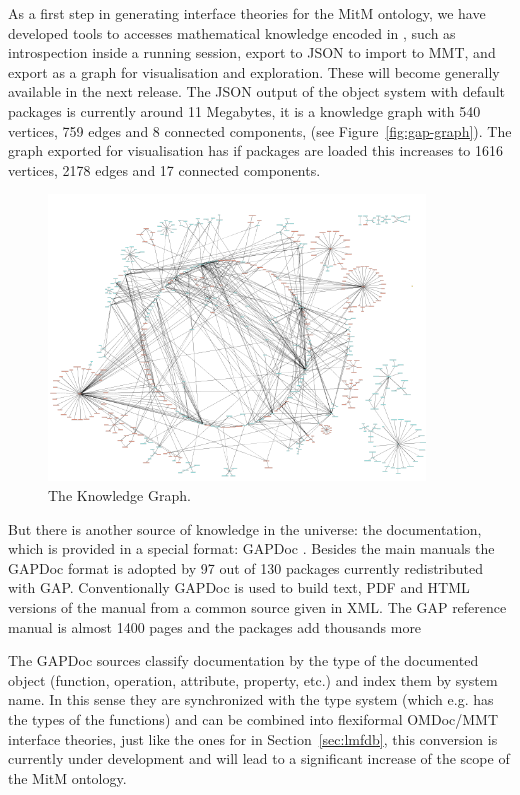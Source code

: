 As a first step in generating interface theories for the MitM ontology, we have developed
tools to accesses mathematical knowledge encoded in \GAP, such as introspection inside a
running \GAP session, export to JSON to import to MMT, and export as a graph for
visualisation and exploration. These will become generally available in the next \GAP
release. The JSON output of the \GAP object system with default packages is currently
around 11 Megabytes, it is a knowledge graph with 540 vertices, 759 edges and 8 connected
components, (see Figure~\ref{fig:gap-graph}). The graph exported for visualisation has if
packages are loaded this increases to 1616 vertices, 2178 edges and 17 connected
components.

\begin{figure}[ht]\centering
  \includegraphics[width=10cm]{gap-graph}
  \caption{The \GAP Knowledge Graph.}
\end{figure}

But there is another source of knowledge in the \GAP universe: the documentation, which is
provided in a special format: GAPDoc \cite{gapdoc}. Besides the main manuals the GAPDoc
format is adopted by 97 out of 130 packages currently redistributed with
GAP. Conventionally GAPDoc is used to build text, PDF and HTML versions of the manual
from a common source given in XML. The GAP reference manual is almost 1400 pages and the
packages add thousands more

The GAPDoc sources classify documentation by the type of the documented object (function,
operation, attribute, property, etc.) and index them by system name. In this sense they
are synchronized with the type system (which e.g. has the types of the functions) and can
be combined into flexiformal OMDoc/MMT interface theories, just like the ones for \LMFDB
in Section~\ref{sec:lmfdb}, this conversion is currently under development and will lead
to a significant increase of the scope of the MitM ontology. 

